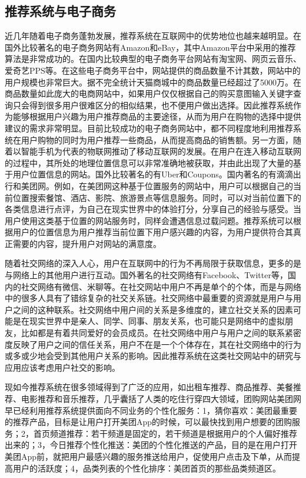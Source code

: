 	\subsection{推荐系统与电子商务}
	近几年随着电子商务蓬勃发展，推荐系统在互联网中的优势地位也越来越明显。在国外比较著名的电子商务网站有Amazon和eBay，其中Amazon平台中采用的推荐算法是非常成功的。在国内比较典型的电子商务平台网站有淘宝网、网页云音乐、爱奇艺PPS等。在这些电子商务平台中，网站提供的商品数量不计其数，网站中的用户规模也非常巨大。据不完全统计天猫商城中的商品数量已经超过了5000万。在商品数量如此庞大的电商网站中，如果用户仅仅根据自己的购买意图输入关键字查询只会得到很多用户很难区分的相似结果，也不便用户做出选择。因此推荐系统作为能够根据用户兴趣\citep{user-interest}为用户推荐商品的主要途径，从而为用户在购物的选择中提供建议的需求非常明显。目前比较成功的电子商务网站中，都不同程度地利用推荐系统在用户购物的同时为用户推荐一些商品，从而提高商品的销售额。另一方面，随着以智能手机为代表的物联网推动了移动互联网的发展。在用户在连入移动互联网的过程中，其所处的地理位置信息可以非常准确地被获取，并由此出现了大量的基于用户位置信息的网站。国外比较著名的有Uber和Coupons。国内著名的有滴滴出行和美团网。例如，在美团网这种基于位置服务的网站中，用户可以根据自己的当前位置搜索餐馆、酒店、影院、旅游景点等信息服务。同时，可以对当前位置下的各类信息进行点评，为自己在现实世界中的体验打分，分享自己的经验与感受。当用户使用这类基于位置的网站服务时，同样会遭遇信息过载问题。推荐系统可以根据用户的位置信息为用户推荐当前位置下用户感兴趣的内容，为用户提供符合其真正需要的内容，提升用户对网站的满意度。

	随着社交网络的深入人心，用户在互联网中的行为不再局限于获取信息，更多的是与网络上的其他用户进行互动。国外著名的社交网络有Facebook、Twitter等，国内的社交网络有微信、米聊等。在社交网站中用户不再是单个的个体，而是与网络中的很多人具有了错综复杂的社交关系链。社交网络中最重要的资源就是用户与用户之间的这种联系。社交网络中用户间的关系是多维度的，建立社交关系的因素可能是在现实世界中是亲人、同学、同事、朋友关系，也可能只是网络中的虚拟朋友，比如都是有着共同爱好的会员成员。在社交网络中用户与用户之间的联系紧密度反映了用户之间的信任关系，用户不在是一个个体存在，其在社交网络中的行为或多或少地会受到其他用户关系的影响。因此推荐系统在这类社交网站中的研究与应用应该考虑用户社交的影响。

	现如今推荐系统在很多领域得到了广泛的应用，如出租车推荐、商品推荐、美餐推荐、电影推荐和音乐推荐，几乎囊括了人类的吃住行穿四大领域，团购网站美团网早已经利用推荐系统提供面向不同业务的个性化服务：1，猜你喜欢：美团最重要的推荐产品，目标是让用户打开美团App的时候，可以最快找到用户想要的团购服务；2，首页频道推荐：若干频道是固定的，若干频道是根据用户的个人偏好推荐出来的；3，今日推荐个性化推送：美团的个性化推送的产品，目的是在用户打开美团App前，就把用户最感兴趣的服务推送给用户，促使用户点击及下单，从而提高用户的活跃度；4，品类列表的个性化排序：美团首页的那些品类频道区。

